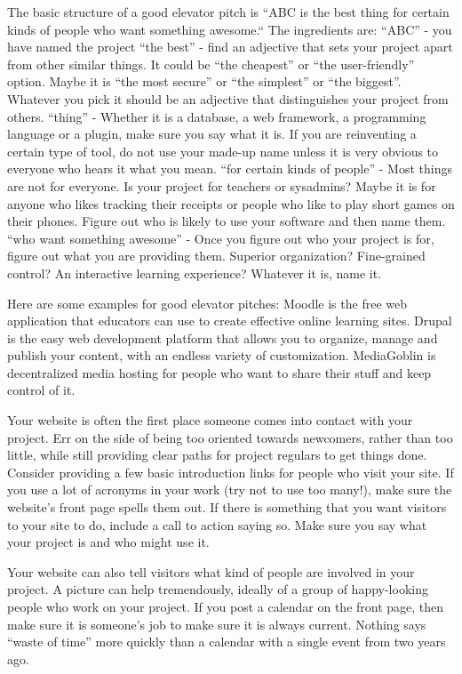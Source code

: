 The basic structure of a good elevator pitch is “ABC is the best thing for certain kinds of people who want something awesome.“ The ingredients are:
“ABC” - you have named the project
“the best” - find an adjective that sets your project apart from other similar things. It could be “the cheapest” or “the user-friendly” option. Maybe it is “the most secure” or “the simplest” or “the biggest”. Whatever you pick it should be an adjective that distinguishes your project from others. 
“thing” - Whether it is a database, a web framework, a programming language or a plugin, make sure you say what it is. If you are reinventing a certain type of tool, do not use your made-up name unless it is very obvious to everyone who hears it what you mean. 
“for certain kinds of people” - Most things are not for everyone. Is your project for teachers or sysadmins? Maybe it is for anyone who likes tracking their receipts or people who like to play short games on their phones. Figure out who is likely to use your software and then name them. 
“who want something awesome” - Once you figure out who your project is for, figure out what you are providing them. Superior organization? Fine-grained control? An interactive learning experience? Whatever it is, name it. 

Here are some examples for good elevator pitches:
Moodle is the free web application that educators can use to create effective online learning sites.
Drupal is the easy web development platform that allows you to organize, manage and publish your content, with an endless variety of customization.
MediaGoblin is decentralized media hosting for people who want to share their stuff and keep control of it.

Your website is often the first place someone comes into contact with your project. Err on the side of being too oriented towards newcomers, rather than too little, while still providing clear paths for project regulars to get things done. Consider providing a few basic introduction links for people who visit your site. If you use a lot of acronyms in your work (try not to use too many!), make sure the website’s front page spells them out. If there is something that you want visitors to your site to do, include a call to action saying so. Make sure you say what your project is and who might use it. 

Your website can also tell visitors what kind of people are involved in your project. A picture can help tremendously, ideally of a group of happy-looking people who work on your project. If you post a calendar on the front page, then make sure it is someone’s job to make sure it is always current. Nothing says “waste of time” more quickly than a calendar with a single event from two years ago.  

